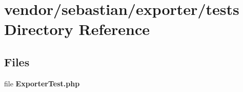 \section{vendor/sebastian/exporter/tests Directory Reference}
\label{dir_e7131a1c47369b03096a4a5f990c2437}
\subsection*{Files}
\begin{DoxyCompactItemize}
\item 
file {\bf Exporter\+Test.\+php}
\end{DoxyCompactItemize}
